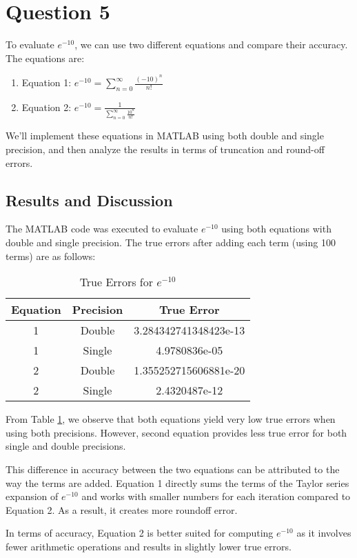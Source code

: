 
\section*{Question 5}

To evaluate \( e^{-10} \), we can use two different equations and compare their accuracy. The equations are:

\begin{enumerate}
    \centering
    \item Equation 1: \( e^{-10} = \sum_{n=0}^{\infty} \frac{(-10)^n}{n!} \)
    \item Equation 2: \( e^{-10} = \frac{1}{\sum_{n=0}^{\infty} \frac{10^n}{n!}} \)
\end{enumerate}

We'll implement these equations in MATLAB using both double and single precision, and then analyze the results in terms of truncation and round-off errors.

\subsection*{Results and Discussion}

The MATLAB code was executed to evaluate \( e^{-10} \) using both equations with double and single precision. The true errors after adding each term (using 100 terms) are as follows:

\begin{table}[h]
    \centering
    \begin{tabular}{|c|c|c|}
    \hline
    Equation & Precision & True Error \\
    \hline
    1 & Double & 3.284342741348423e-13 \\
    1 & Single & 4.9780836e-05 \\
    2 & Double & 1.355252715606881e-20 \\
    2 & Single & 2.4320487e-12 \\
    \hline
    \end{tabular}
    \caption{True Errors for \( e^{-10} \)}
    \label{tab:true_errors}
\end{table}

From Table \ref{tab:true_errors}, we observe that both equations yield very low true errors when using both precisions. However, second equation provides less true error for both single and double precisions.

This difference in accuracy between the two equations can be attributed to the way the terms are added. Equation 1 directly sums the terms of the Taylor series expansion of \( e^{-10} \) and works with smaller numbers for each iteration compared to Equation 2. As a result, it creates more roundoff error.

In terms of accuracy, Equation 2 is better suited for computing \( e^{-10} \) as it involves fewer arithmetic operations and results in slightly lower true errors. 

